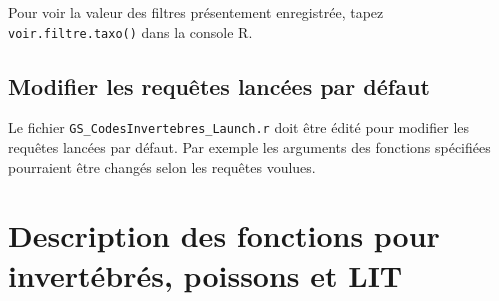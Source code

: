 \documentclass{article}
\begin{document}

Pour voir la valeur des filtres présentement enregistrée, tapez
\texttt{voir.filtre.taxo()} dans la console R.

\subsection{Modifier les requêtes lancées par défaut}
Le fichier \texttt{GS\_CodesInvertebres\_Launch.r} doit être édité
pour modifier les requêtes lancées par défaut. Par exemple les
arguments des fonctions spécifiées pourraient être changés selon les
requêtes voulues.

\section{Description des fonctions pour invertébrés, poissons et LIT}
\end{document}
